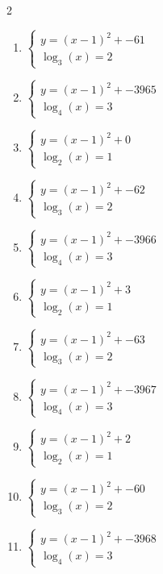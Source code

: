 \documentclass[12pt,a4paper]{article}
\begin{document}
\begin{multicols}{2}
\begin{enumerate}[leftmargin=*, itemsep=6pt]
\item \(\begin{cases} y=(x-1)^2+-61\\ \log_{3}\left(x\right)=2\end{cases}\)

\item \(\begin{cases} y=(x-1)^2+-3965\\ \log_{4}\left(x\right)=3\end{cases}\)

\item \(\begin{cases} y=(x-1)^2+0\\ \log_{2}\left(x\right)=1\end{cases}\)

\item \(\begin{cases} y=(x-1)^2+-62\\ \log_{3}\left(x\right)=2\end{cases}\)

\item \(\begin{cases} y=(x-1)^2+-3966\\ \log_{4}\left(x\right)=3\end{cases}\)

\item \(\begin{cases} y=(x-1)^2+3\\ \log_{2}\left(x\right)=1\end{cases}\)

\item \(\begin{cases} y=(x-1)^2+-63\\ \log_{3}\left(x\right)=2\end{cases}\)

\item \(\begin{cases} y=(x-1)^2+-3967\\ \log_{4}\left(x\right)=3\end{cases}\)

\item \(\begin{cases} y=(x-1)^2+2\\ \log_{2}\left(x\right)=1\end{cases}\)

\item \(\begin{cases} y=(x-1)^2+-60\\ \log_{3}\left(x\right)=2\end{cases}\)

\item \(\begin{cases} y=(x-1)^2+-3968\\ \log_{4}\left(x\right)=3\end{cases}\)

\end{enumerate}
\end{multicols}
\newpage
\end{document}
